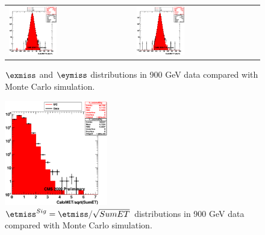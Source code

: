 \begin{figure}[h!]
 \centering
 \begin{tabular}{ll}
  \includegraphics[width=0.40\textwidth]{plots_DataVsMC_MB_900GeV/h_calometPx.eps} &
  \includegraphics[width=0.40\textwidth]{plots_DataVsMC_MB_900GeV/h_calometPy.eps} \\
 \end{tabular}
 \caption{$\exmiss$ and $\eymiss$ distributions in 900 GeV data compared
   with Monte Carlo simulation.
          \label{fig:DataVsMC_MB_900_2}}
\end{figure}

\begin{figure}[h!]
 \centering
 \includegraphics[width=0.40\textwidth]{plots_DataVsMC_MB_900GeV/h_calometSig.eps}
\caption{$\etmiss^{Sig}=\etmiss/\sqrt{SumET}$ distributions in 900 GeV data compared
   with Monte Carlo simulation.
          \label{fig:DataVsMC_MB_900_3}}
\end{figure}

